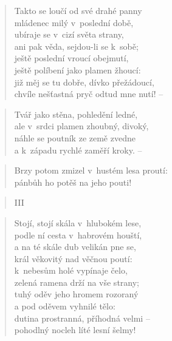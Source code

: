 \begin{verse}
Takto se loučí od své drahé panny \\
mládenec milý v~poslední době, \\
ubíraje se v~cizí světa strany, \\
ani pak věda, sejdou-li se k~sobě; \\
ještě poslední vroucí obejmutí, \\
ještě políbení jako plamen žhoucí: \\
již měj se tu dobře, dívko přežádoucí, \\
chvíle nešťastná pryč odtud mne nutí! --
\end{verse}

\begin{verse}
Tvář jako stěna, pohledění ledné, \\
ale v~srdci plamen zhoubný, divoký, \\
náhle se poutník ze země zvedne \\
a k~západu rychlé zaměří kroky. --
\end{verse}

\begin{verse}
Brzy potom zmizel v~hustém lesa proutí: \\
pánbůh ho potěš na jeho pouti!
\end{verse}

\begin{verse}
III
\end{verse}

\begin{verse}
Stojí, stojí skála v~hlubokém lese, \\
podle ní cesta v~habrovém houští, \\
a na té skále dub velikán pne se, \\
král věkovitý nad věčnou poutí: \\
k~nebesům holé vypínaje čelo, \\
zelená ramena drží na vše strany; \\
tuhý oděv jeho hromem rozoraný \\
a pod oděvem vyhnilé tělo: \\
dutina prostranná, příhodná velmi -- \\
pohodlný nocleh líté lesní šelmy!
\end{verse}

